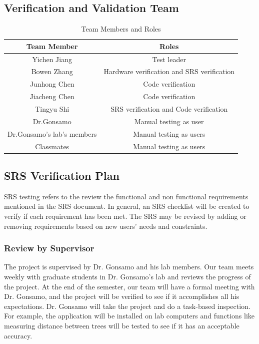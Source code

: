 \documentclass[12pt, titlepage]{article}
\begin{document}
\subsection{Verification and Validation Team}
\begin{table}[H]
    \centering
    \begin{tabular}{|c|c|}
    \hline
         Team Member  & Roles\\
         \hline
         Yichen Jiang & Test leader\\
         \hline
         Bowen Zhang  & Hardware verification and SRS verification\\
         \hline
         Junhong Chen & Code verification\\
         \hline
         Jiacheng Chen & Code verification\\
         \hline
         Tingyu Shi & SRS verification and Code verification\\
         \hline
         Dr.Gonsamo & Manual testing as user\\
         \hline
         Dr.Gonsamo's lab's members  & Manual testing as users\\
         \hline
         Classmates & Manual testing as users\\
         \hline
    \end{tabular}
    \caption{Team Members and Roles}
\end{table}

\subsection{SRS Verification Plan}
SRS testing refers to the review the functional and non functional requirements mentioned
in the SRS document. In general, an SRS checklist will be created to verify if each requirement has
been met. The SRS may be revised by adding or removing requirements based on new
users' needs and constraints.

\subsubsection{Review by Supervisor}
The project is supervised by Dr. Gonsamo and his lab members. Our team meets weekly
with graduate students in Dr. Gonsamo's lab and reviews the progress of the project.
At the end of the semester, our team will have a formal meeting with Dr. Gonsamo, and
the project will be verified to see if it accomplishes all his expectations. 
Dr. Gonsamo will take the project and do a task-based inspection. For example, the
application will be installed on lab computers and functions like measuring distance
between trees will be tested to see if it has an acceptable accuracy.
\end{document}

